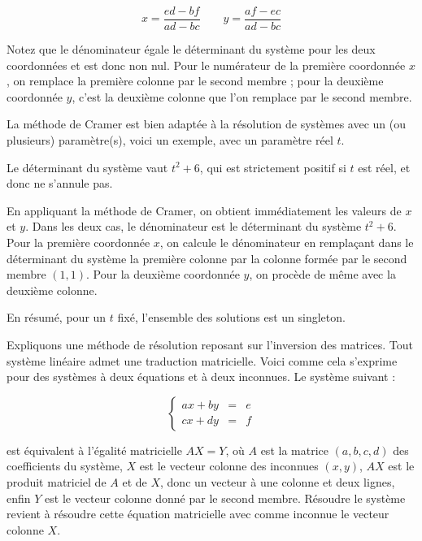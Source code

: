 $$x=\frac{ed-bf}{ad-bc} \qquad y=\frac{af-ec}{ad-bc}$$

Notez que le dénominateur égale le déterminant du système pour les deux coordonnées et est donc non nul.
Pour le numérateur de la première coordonnée $x$, on remplace la première colonne par le second membre ;
pour la deuxième coordonnée $y$, c'est la deuxième colonne que l'on remplace par le second membre.


\diapo

La méthode de Cramer est bien adaptée à la résolution de systèmes avec un (ou plusieurs) paramètre(s), voici un exemple,
avec un paramètre réel $t$.

\change

Le déterminant du système vaut $t^2+6$, qui est strictement positif si $t$ est réel, et donc ne s'annule pas.

\change

En appliquant la méthode de Cramer, on obtient immédiatement les valeurs de $x$ et $y$. 
Dans les deux cas, le dénominateur est le déterminant du système $t^2+6$. 
Pour la première coordonnée $x$, on calcule le dénominateur en remplaçant dans le 
déterminant du système la première colonne par la colonne formée par le second membre $(1,1)$. Pour la deuxième coordonnée $y$, on procède de même avec la deuxième colonne.

\change

En résumé, pour un $t$ fixé, l'ensemble des solutions est un singleton.

\diapo

Expliquons une méthode de résolution reposant sur l'inversion des matrices. Tout système linéaire admet une traduction matricielle. Voici comme cela s'exprime pour des systèmes à deux équations et à deux inconnues. Le système suivant : 

$$
\left\{\begin{array}{rcl} 
a x + b y & = & e\\
c x + d y & = & f 
\end{array}\right.  
$$


\change

est équivalent à l'égalité matricielle $AX=Y$, où $A$ est la matrice $(a,b,c,d)$
des coefficients du système, $X$ est le vecteur colonne des inconnues 
$(x,y)$, $AX$ est le produit matriciel de $A$ et de $X$, donc un 
vecteur à une colonne et deux lignes, enfin $Y$ est le vecteur colonne 
donné par le second membre. Résoudre le système revient à résoudre cette 
équation matricielle avec comme inconnue le vecteur colonne $X$.


